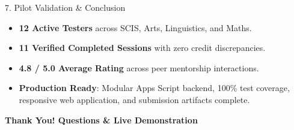 \documentclass[aspectratio=169,10pt]{beamer}
\begin{document}
\begin{frame}{7. Pilot Validation \& Conclusion}
  \begin{itemize}
    \item \textbf{12 Active Testers} across SCIS, Arts, Linguistics, and Maths.
    \item \textbf{11 Verified Completed Sessions} with zero credit discrepancies.
    \item \textbf{4.8 / 5.0 Average Rating} across peer mentorship interactions.
    \item \textbf{Production Ready}: Modular Apps Script backend, 100\% test coverage, responsive web application, and submission artifacts complete.
  \end{itemize}

  \vspace{1.5em}
  \begin{center}
    \Large \textbf{Thank You! Questions \& Live Demonstration}
  \end{center}
\end{frame}
\end{document}
